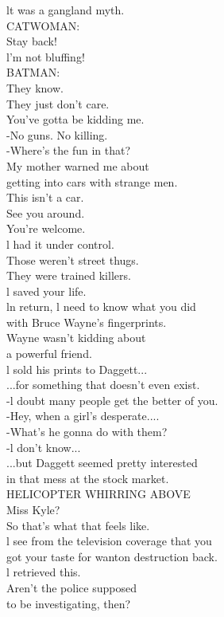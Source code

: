 \documentclass{article}
\begin{document}
\begin{multicols}{3}
lt was a gangland myth.\\
CATWOMAN:\\
Stay back!\\
l'm not bluffing!\\
BATMAN:\\
They know.\\
They just don't care.\\
You've gotta be kidding me.\\
-No guns. No killing.\\
-Where's the fun in that?\\
My mother warned me about\\
getting into cars with strange men.\\
This isn't a car.\\
See you around.\\
You're welcome.\\
l had it under control.\\
Those weren't street thugs.\\
They were trained killers.\\
l saved your life.\\
ln return, l need to know what you did\\
with Bruce Wayne's fingerprints.\\
Wayne wasn't kidding about\\
a powerful friend.\\
l sold his prints to Daggett...\\
...for something that doesn't even exist.\\
-l doubt many people get the better of you.\\
-Hey, when a girl's desperate....\\
-What's he gonna do with them?\\
-l don't know...\\
...but Daggett seemed pretty interested\\
in that mess at the stock market.\\
HELICOPTER WHIRRING ABOVE\\
Miss Kyle?\\
So that's what that feels like.\\
l see from the television coverage that you\\
got your taste for wanton destruction back.\\
l retrieved this.\\
Aren't the police supposed\\
to be investigating, then?\\

\end{multicols}
\end{document}
